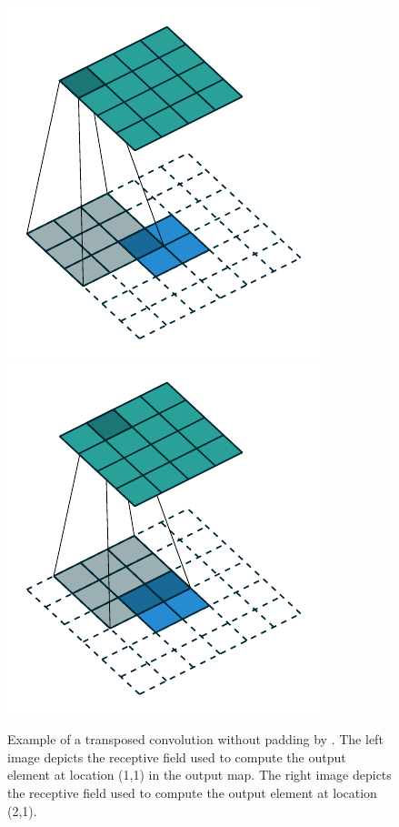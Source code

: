 \begin{figure}
\centering
    \includegraphics[width=.3\textwidth]{graphics/no_padding_no_strides_transposed_00.pdf}
    \includegraphics[width=.3\textwidth]{graphics/no_padding_no_strides_transposed_01.pdf}
    \caption{Example of a transposed convolution without padding by \citet{dumoulin2016guide}. The left image depicts the receptive field used to compute the output element at location (1,1) in the output map. The right image depicts the receptive field used to compute the output element at location (2,1).}
    \label{fig:deconvolution}
\end{figure}


